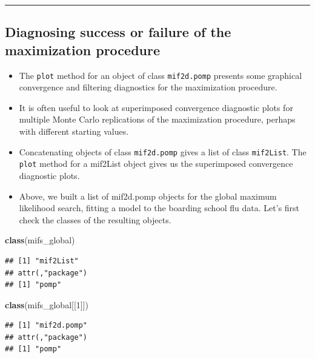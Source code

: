 \documentclass[]{article}
\newenvironment{Shaded}{\begin{snugshade}}{\end{snugshade}}
\newcommand{\KeywordTok}[1]{\textcolor[rgb]{0.13,0.29,0.53}{\textbf{#1}}}
\newcommand{\DecValTok}[1]{\textcolor[rgb]{0.00,0.00,0.81}{#1}}
\newcommand{\NormalTok}[1]{#1}
\begin{document}
\begin{center}\rule{0.5\linewidth}{\linethickness}\end{center}

\subsection{Diagnosing success or failure of the maximization
procedure}\label{diagnosing-success-or-failure-of-the-maximization-procedure}

\begin{itemize}
\item
  The \texttt{plot} method for an object of class \texttt{mif2d.pomp}
  presents some graphical convergence and filtering diagnostics for the
  maximization procedure.
\item
  It is often useful to look at superimposed convergence diagnostic
  plots for multiple Monte Carlo replications of the maximization
  procedure, perhaps with different starting values.
\item
  Concatenating objects of class \texttt{mif2d.pomp} gives a list of
  class \texttt{mif2List}. The \texttt{plot} method for a mif2List
  object gives us the superimposed convergence diagnostic plots.
\item
  Above, we built a list of mif2d.pomp objects for the global maximum
  likelihood search, fitting a model to the boarding school flu data.
  Let's first check the classes of the resulting objects.
\end{itemize}

\begin{Shaded}
\begin{Highlighting}[]
\KeywordTok{class}\NormalTok{(mifs_global)}
\end{Highlighting}
\end{Shaded}

\begin{verbatim}
## [1] "mif2List"
## attr(,"package")
## [1] "pomp"
\end{verbatim}

\begin{Shaded}
\begin{Highlighting}[]
\KeywordTok{class}\NormalTok{(mifs_global[[}\DecValTok{1}\NormalTok{]])}
\end{Highlighting}
\end{Shaded}

\begin{verbatim}
## [1] "mif2d.pomp"
## attr(,"package")
## [1] "pomp"
\end{verbatim}
\end{document}
